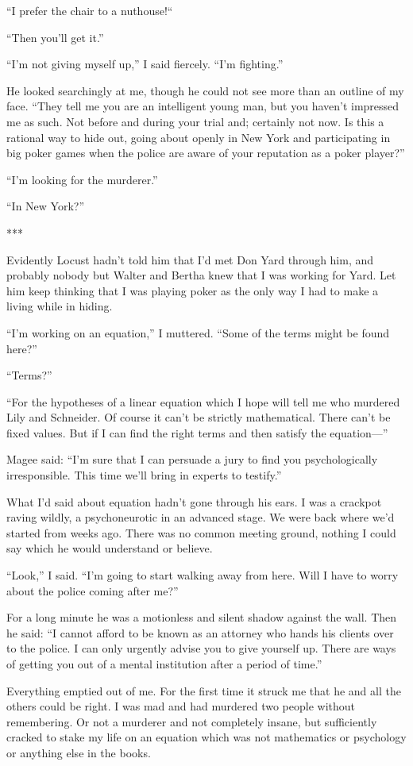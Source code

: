 {“I prefer the chair to a nuthouse!“

“Then you’ll get it.”

“I’m not giving myself up,” I said fiercely. “I’m fighting.”

He looked searchingly at me, though he could not see more than an outline of my face. “They tell me you are an intelligent young man, but you haven’t impressed me as such. Not before and during your trial and; certainly not now. Is this a rational way to hide out, going about openly in New York and participating in big poker games when the police are aware of your reputation as a poker player?”

“I’m looking for the murderer.”

“In New York?”

***

Evidently Locust hadn’t told him that I’d met Don Yard through him, and probably nobody but Walter and Bertha knew that I was working for Yard. Let him keep thinking that I was playing poker as the only way I had to make a living while in hiding.

“I’m working on an equation,” I muttered. “Some of the terms might be found here?”

“Terms?”

“For the hypotheses of a linear equation which I hope will tell me who murdered Lily and Schneider. Of course it can’t be strictly mathematical. There can’t be fixed values. But if I can find the right terms and then satisfy the equation—”

Magee said: “I’m sure that I can persuade a jury to find you psychologically irresponsible. This time we’ll bring in experts to testify.”

What I’d said about equation hadn’t gone through his ears. I was a crackpot raving wildly, a psychoneurotic in an advanced stage. We were back where we’d started from weeks ago. There was no common meeting ground, nothing I could say which he would understand or believe.

“Look,” I said. “I’m going to start walking away from here. Will I have to worry about the police coming after me?”

For a long minute he was a motionless and silent shadow against the wall. Then he said: “I cannot afford to be known as an attorney who hands his clients over to the police. I can only urgently advise you to give yourself up. There are ways of getting you out of a mental institution after a period of time.”

Everything emptied out of me. For the first time it struck me that he and all the others could be right. I was mad and had murdered two people without remembering. Or not a murderer and not completely insane, but sufficiently cracked to stake my life on an equation which was not mathematics or psychology or anything else in the books.

}
